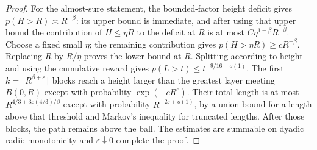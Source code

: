 \begin{proof}
For the almost-sure statement, the bounded-factor height deficit gives
$p(H>R)\asymp R^{-\beta}$: its upper bound is immediate, and after using
that upper bound the contribution of $H\le\eta R$ to the deficit at $R$
is at most $C\eta^{1-\beta}R^{-\beta}$.  Choose a fixed small $\eta$;
the remaining contribution gives $p(H>\eta R)\ge cR^{-\beta}$.
Replacing $R$ by $R/\eta$ proves the lower bound at $R$.
Splitting according to height and using the cumulative reward gives
$p(L>t)\le t^{-9/16+o(1)}$.
The first $k=\lceil R^{\beta+\varepsilon}\rceil$ blocks reach a height
larger than the greatest layer meeting $B(0,R)$ except with probability
$\exp(-cR^\varepsilon)$.  Their total length is at most
$R^{4/3+3\varepsilon(4/3)/\beta}$ except with probability
$R^{-2\varepsilon+o(1)}$, by a union bound for a length above that threshold
and Markov's inequality for truncated lengths.  After those blocks, the
path remains above the ball.  The estimates are summable on dyadic radii;
monotonicity and $\varepsilon\downarrow0$ complete the proof.
\end{proof}
